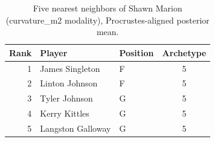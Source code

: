 \begin{table}[htbp]
  \centering\small
  \begin{tabular}{rllc}
    \toprule
    Rank & Player & Position & Archetype \\
    \midrule
    1 & James Singleton & F & 5 \\
    2 & Linton Johnson & F & 5 \\
    3 & Tyler Johnson & G & 5 \\
    4 & Kerry Kittles & G & 5 \\
    5 & Langston Galloway & G & 5 \\
    \bottomrule
  \end{tabular}
  \caption{Five nearest neighbors of Shawn Marion (curvature_m2 modality), Procrustes-aligned posterior mean.}
  \label{tab:Shawn_Marion_neighbors_curvature_m2}
\end{table}

